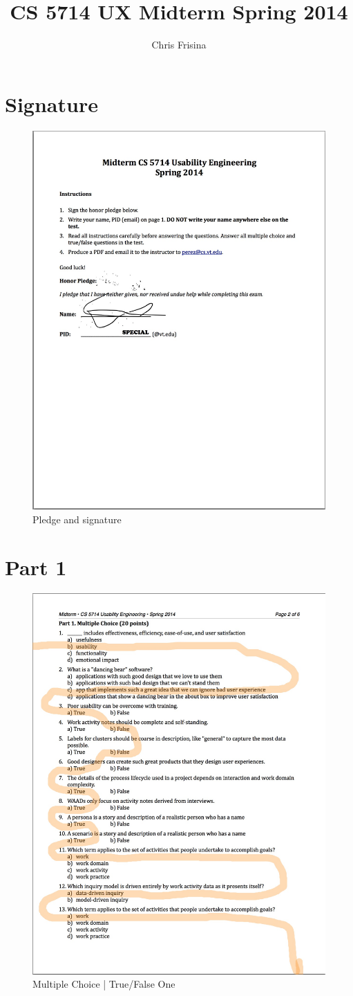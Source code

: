 \documentclass[11pt]{article}
\begin{document}
\title{CS 5714 UX Midterm Spring 2014}
\author{Chris Frisina}

\section*{Signature} %
  \begin{figure}[H]
  \centering
  \includegraphics[height=0.9\linewidth]{img/signature.jpg}
  \caption{Pledge and signature}
  \label{fig:signature}
  \end{figure}

\section*{Part 1} %
  \begin{figure}[H]
  \centering
  \includegraphics[height=0.9\linewidth]{img/one.jpg}
  \caption{Multiple Choice | True/False One}
  \label{fig:one}
  \end{figure}
\end{document}
